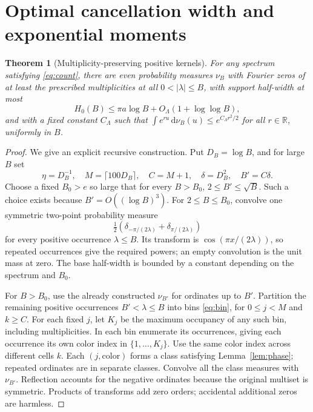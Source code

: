 \documentclass[11pt]{article}
\newtheorem{theorem}{Theorem}[section]
\theoremstyle{definition}\newtheorem{definition}[theorem]{Definition}
\newcommand{\R}{\mathbb R}\newcommand{\C}{\mathbb C}\newcommand{\F}{\mathcal F}\newcommand{\sinc}{\operatorname{sinc}}\newcommand{\arcosh}{\operatorname{arcosh}}\newcommand{\sech}{\operatorname{sech}}\newcommand{\ord}{\operatorname{ord}}\newcommand{\supp}{\operatorname{supp}}\newcommand{\dd}{\,\mathrm d}\newcommand{\vnorm}[1]{\lVert #1\rVert}
\begin{document}
\section{Optimal cancellation width and exponential moments}
\begin{theorem}[Multiplicity-preserving positive kernels]\label{thm:cancel}
For any spectrum satisfying \eqref{eq:count}, there are even probability measures $\nu_B$ with Fourier zeros of at least the prescribed multiplicities at all $0<|\lambda|\le B$, with support half-width at most
\[
 H_0(B)\le\pi a\log B+O_\Lambda(1+\log\log B),
\]
and with a fixed constant $C_\Lambda$ such that $\int e^{ru}\dd\nu_B(u)\le e^{C_\Lambda r^2/2}$ for all $r\in\R$, uniformly in $B$.
\end{theorem}
\begin{proof}
We give an explicit recursive construction. Put $D_B=\log B$, and for large $B$ set
\begin{equation}\label{eq:parameters}
 \eta=D_B^{-1},\quad M=\lceil100D_B\rceil,\quad C=M+1,\quad \delta=D_B^2,\quad B'=C\delta.
\end{equation}
Choose a fixed $B_0>e$ so large that for every $B>B_0$, $2\le B'\le\sqrt B$. Such a choice exists because $B'=O((\log B)^3)$. For $2\le B\le B_0$, convolve one symmetric two-point probability measure
\[
 \tfrac12(\delta_{-\pi/(2\lambda)}+\delta_{\pi/(2\lambda)})
\]
for every positive occurrence $\lambda\le B$. Its transform is $\cos(\pi x/(2\lambda))$, so repeated occurrences give the required powers; an empty convolution is the unit mass at zero. The base half-width is bounded by a constant depending on the spectrum and $B_0$.

For $B>B_0$, use the already constructed $\nu_{B'}$ for ordinates up to $B'$. Partition the remaining positive occurrences $B'<\lambda\le B$ into bins \eqref{eq:bin}, for $0\le j<M$ and $k\ge C$. For each fixed $j$, let $K_j$ be the maximum occupancy of any such bin, including multiplicities. In each bin enumerate its occurrences, giving each occurrence its own color index in $\{1,\dots,K_j\}$. Use the same color index across different cells $k$. Each $(j,\text{color})$ forms a class satisfying Lemma~\ref{lem:phase}; repeated ordinates are in separate classes. Convolve all the class measures with $\nu_{B'}$. Reflection accounts for the negative ordinates because the original multiset is symmetric. Products of transforms add zero orders; accidental additional zeros are harmless.


\end{proof}
\end{document}
